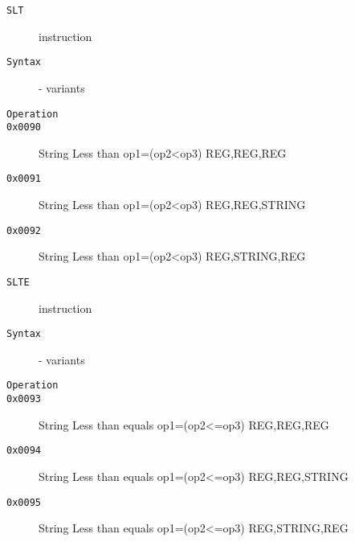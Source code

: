 \clearpage
\begin{description}
\item[\texttt{SLT}] instruction\\
\item[\texttt{Syntax}] - variants\\

\item[\texttt{Operation}]
\item[\texttt{}]
\item[\texttt{0x0090}] String Less than op1=(op2<op3)  {REG,REG,REG}       \\
\item[\texttt{0x0091}] String Less than op1=(op2<op3)  {REG,REG,STRING}    \\
\item[\texttt{0x0092}] String Less than op1=(op2<op3)  {REG,STRING,REG}    \\
\end{description}
\clearpage
\begin{description}
\item[\texttt{SLTE}] instruction\\
\item[\texttt{Syntax}] - variants\\

\item[\texttt{Operation}]
\item[\texttt{}]
\item[\texttt{0x0093}] String Less than equals op1=(op2<=op3)  {REG,REG,REG}       \\
\item[\texttt{0x0094}] String Less than equals op1=(op2<=op3)  {REG,REG,STRING}    \\
\item[\texttt{0x0095}] String Less than equals op1=(op2<=op3)  {REG,STRING,REG}    \\
\end{description}
